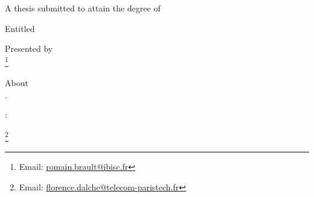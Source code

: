 
\begin{titlepage}

\renewcommand*{\thefootnote}{\fnsymbol{footnote}}
\begin{addmargin}[-1cm]{-3cm}
\begin{center}
\large

\hfill
\vfill

\begingroup
A thesis submitted to attain the degree of \\ \bigskip 
{\Huge \color{Maroon} }
\endgroup

\vfill

\begingroup
Entitled \\ \bigskip
{\Huge \color{Maroon}\spacedallcaps{\myTitle}}
\endgroup

\vfill

Presented by \\ \bigskip 
{\Large\textbf{\spacedlowsmallcaps{\myName}}}\footnote{Email: \href{mailto:romain.brault@ibisc.fr}{romain.brault@ibisc.fr}} %

\vfill

\begingroup
About \\ \bigskip
{\Large \textbf{\mySubtitle}}. %
\endgroup

\vfill

\noindent {}:
\par
\mySupervisorDegree \mySupervisor\footnote{Email: \href{mailto:florence.dalche@telecom-paristech.fr}{florence.dalche@telecom-paristech.fr}}

\vfill


\end{center}
\end{addmargin}
\end{titlepage}
